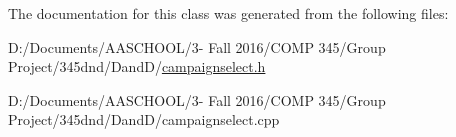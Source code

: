 The documentation for this class was generated from the following files\+:\begin{DoxyCompactItemize}
\item 
D\+:/\+Documents/\+A\+A\+S\+C\+H\+O\+O\+L/3-\/ Fall 2016/\+C\+O\+M\+P 345/\+Group Project/345dnd/\+Dand\+D/\hyperlink{campaignselect_8h}{campaignselect.\+h}\item 
D\+:/\+Documents/\+A\+A\+S\+C\+H\+O\+O\+L/3-\/ Fall 2016/\+C\+O\+M\+P 345/\+Group Project/345dnd/\+Dand\+D/campaignselect.\+cpp\end{DoxyCompactItemize}
